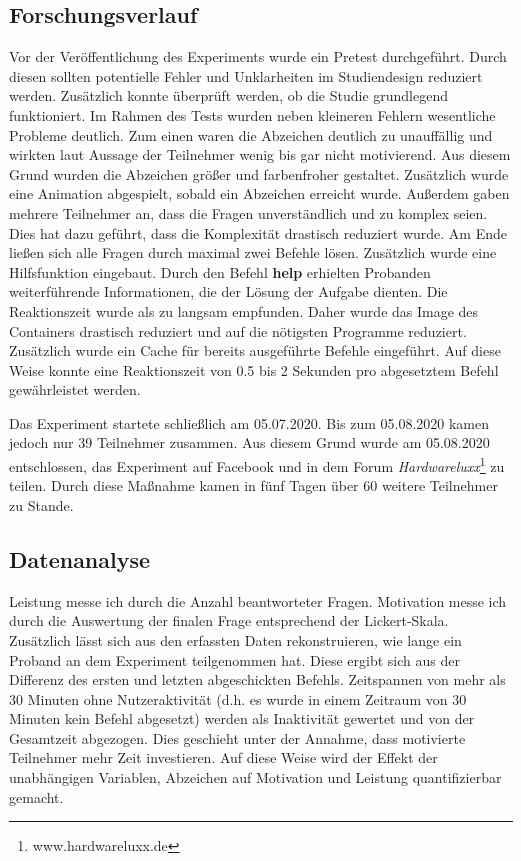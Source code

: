 \subsection{Forschungsverlauf}
Vor der Veröffentlichung des Experiments wurde ein Pretest durchgeführt. Durch diesen sollten potentielle Fehler und Unklarheiten im Studiendesign reduziert werden. Zusätzlich konnte überprüft werden, ob die Studie grundlegend funktioniert. Im Rahmen des Tests wurden neben kleineren Fehlern wesentliche Probleme deutlich. Zum einen waren die Abzeichen deutlich zu unauffällig und wirkten laut Aussage der Teilnehmer wenig bis gar nicht motivierend. Aus diesem Grund wurden die Abzeichen größer und farbenfroher gestaltet. Zusätzlich wurde eine Animation abgespielt, sobald ein Abzeichen erreicht wurde. Außerdem gaben mehrere Teilnehmer an, dass die Fragen unverständlich und zu komplex seien. Dies hat dazu geführt, dass die Komplexität drastisch reduziert wurde. Am Ende ließen sich alle Fragen durch maximal zwei Befehle lösen. Zusätzlich wurde eine Hilfsfunktion eingebaut. Durch den Befehl \textbf{help} erhielten Probanden weiterführende Informationen, die der Lösung der Aufgabe dienten. Die Reaktionszeit wurde als zu langsam empfunden. Daher wurde das Image des Containers drastisch reduziert und auf die nötigsten Programme reduziert. Zusätzlich wurde ein Cache für bereits ausgeführte Befehle eingeführt. Auf diese Weise konnte eine Reaktionszeit von 0.5 bis 2 Sekunden pro abgesetztem Befehl gewährleistet werden.

Das Experiment startete schließlich am 05.07.2020. Bis zum 05.08.2020 kamen jedoch nur 39 Teilnehmer zusammen. Aus diesem Grund wurde am 05.08.2020 entschlossen, das Experiment auf Facebook und in dem Forum \textit{Hardwareluxx}\footnote{www.hardwareluxx.de} zu teilen. Durch diese Maßnahme kamen in fünf Tagen über 60 weitere Teilnehmer zu Stande.

\subsection{Datenanalyse}

Leistung messe ich durch die Anzahl beantworteter Fragen. Motivation messe ich durch die Auswertung der finalen Frage entsprechend der Lickert-Skala. Zusätzlich lässt sich aus den erfassten Daten rekonstruieren, wie lange ein Proband an dem Experiment teilgenommen hat. Diese ergibt sich aus der Differenz des ersten und letzten abgeschickten Befehls. Zeitspannen von mehr als 30 Minuten ohne Nutzeraktivität (d.h. es wurde in einem Zeitraum von 30 Minuten kein Befehl abgesetzt) werden als Inaktivität gewertet und von der Gesamtzeit abgezogen. Dies geschieht unter der Annahme, dass motivierte Teilnehmer mehr Zeit investieren. Auf diese Weise wird der Effekt der unabhängigen Variablen, Abzeichen auf Motivation und Leistung quantifizierbar gemacht.